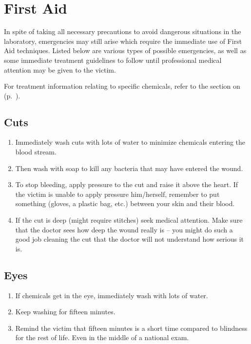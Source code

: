 \chapter{First Aid} 
\label{cha:firstaid}

In spite of taking all necessary precautions to avoid dangerous situations in the laboratory, emergencies may still arise which require the immediate use of First Aid techniques. Listed below are various types of possible emergencies, as well as some immediate treatment guidelines to follow until professional medical attention may be given to the victim.

For treatment information relating to specific chemicals, refer to the section on  (p.~\pageref{cha:dangerchem}).


\section{Cuts}

\begin{enumerate}
\item{Immediately wash cuts with lots of water 
to minimize chemicals entering the blood stream.}
\item{Then wash with soap to kill any bacteria that may have entered the wound.}
\item{To stop bleeding, apply pressure to the cut and raise it above the heart. 
If the victim is unable to apply pressure him/herself, 
remember to put something (gloves, a plastic bag, etc.) 
between your skin and their blood.}
\item{If the cut is deep (might require stitches) seek medical attention. 
Make sure that the doctor sees how deep the wound really is -- 
you might do such a good job cleaning the cut 
that the doctor will not understand how serious it is.}
\end{enumerate}

\section{Eyes}

\begin{enumerate}
\item{If chemicals get in the eye, immediately wash with lots of water.}
\item{Keep washing for fifteen minutes.}
\item{Remind the victim that fifteen minutes is a short time 
compared to blindness for the rest of life. 
Even in the middle of a national exam.}
\end{enumerate}

